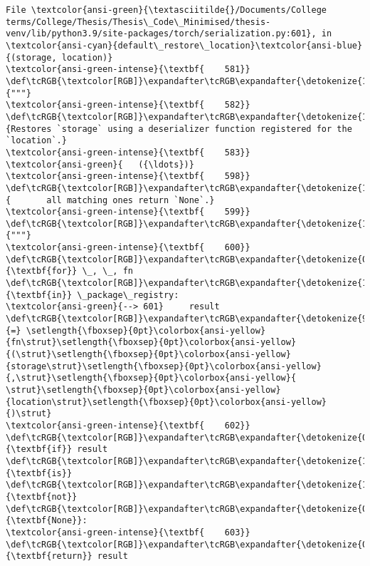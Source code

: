 \documentclass[11pt]{article}
\begin{document}
\begin{Verbatim}[commandchars=\\\{\}, frame=single, framerule=2mm, rulecolor=\color{outerrorbackground}]
File \textcolor{ansi-green}{\textasciitilde{}/Documents/College terms/College/Thesis/Thesis\_Code\_Minimised/thesis-venv/lib/python3.9/site-packages/torch/serialization.py:601}, in \textcolor{ansi-cyan}{default\_restore\_location}\textcolor{ansi-blue}{(storage, location)}
\textcolor{ansi-green-intense}{\textbf{    581}} \def\tcRGB{\textcolor[RGB]}\expandafter\tcRGB\expandafter{\detokenize{175,0,0}}{"""}
\textcolor{ansi-green-intense}{\textbf{    582}} \def\tcRGB{\textcolor[RGB]}\expandafter\tcRGB\expandafter{\detokenize{175,0,0}}{Restores `storage` using a deserializer function registered for the `location`.}
\textcolor{ansi-green-intense}{\textbf{    583}} 
\textcolor{ansi-green}{   ({\ldots})}
\textcolor{ansi-green-intense}{\textbf{    598}} \def\tcRGB{\textcolor[RGB]}\expandafter\tcRGB\expandafter{\detokenize{175,0,0}}{       all matching ones return `None`.}
\textcolor{ansi-green-intense}{\textbf{    599}} \def\tcRGB{\textcolor[RGB]}\expandafter\tcRGB\expandafter{\detokenize{175,0,0}}{"""}
\textcolor{ansi-green-intense}{\textbf{    600}} \def\tcRGB{\textcolor[RGB]}\expandafter\tcRGB\expandafter{\detokenize{0,135,0}}{\textbf{for}} \_, \_, fn \def\tcRGB{\textcolor[RGB]}\expandafter\tcRGB\expandafter{\detokenize{175,0,255}}{\textbf{in}} \_package\_registry:
\textcolor{ansi-green}{--> 601}     result \def\tcRGB{\textcolor[RGB]}\expandafter\tcRGB\expandafter{\detokenize{98,98,98}}{=} \setlength{\fboxsep}{0pt}\colorbox{ansi-yellow}{fn\strut}\setlength{\fboxsep}{0pt}\colorbox{ansi-yellow}{(\strut}\setlength{\fboxsep}{0pt}\colorbox{ansi-yellow}{storage\strut}\setlength{\fboxsep}{0pt}\colorbox{ansi-yellow}{,\strut}\setlength{\fboxsep}{0pt}\colorbox{ansi-yellow}{ \strut}\setlength{\fboxsep}{0pt}\colorbox{ansi-yellow}{location\strut}\setlength{\fboxsep}{0pt}\colorbox{ansi-yellow}{)\strut}
\textcolor{ansi-green-intense}{\textbf{    602}}     \def\tcRGB{\textcolor[RGB]}\expandafter\tcRGB\expandafter{\detokenize{0,135,0}}{\textbf{if}} result \def\tcRGB{\textcolor[RGB]}\expandafter\tcRGB\expandafter{\detokenize{175,0,255}}{\textbf{is}} \def\tcRGB{\textcolor[RGB]}\expandafter\tcRGB\expandafter{\detokenize{175,0,255}}{\textbf{not}} \def\tcRGB{\textcolor[RGB]}\expandafter\tcRGB\expandafter{\detokenize{0,135,0}}{\textbf{None}}:
\textcolor{ansi-green-intense}{\textbf{    603}}         \def\tcRGB{\textcolor[RGB]}\expandafter\tcRGB\expandafter{\detokenize{0,135,0}}{\textbf{return}} result


\end{Verbatim}
\end{document}
